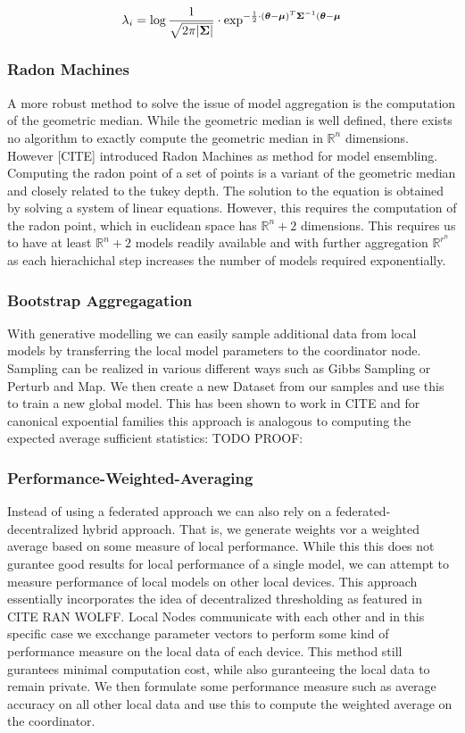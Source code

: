 \begin{equation}
    \lambda_i = \log \frac{1}{\sqrt{2\pi\lvert \boldsymbol{\Sigma} \rvert}} \cdot \exp^{-\frac{1}{2} \cdot (\boldsymbol{\theta} - \boldsymbol{\mu})^T\boldsymbol{\Sigma}^{-1}(\boldsymbol{\theta} - \boldsymbol{\mu}}
\end{equation}
\subsubsection{Radon Machines}
A more robust method to solve the issue of model aggregation is the computation of the geometric median.
While the geometric median is well defined, there exists no algorithm to exactly compute the geometric median in $\mathbb{R}^n$ dimensions.
However [CITE] introduced Radon Machines as method for model ensembling.
Computing the radon point of a set of points is a variant of the geometric median and closely related to the tukey depth. 
The solution to the equation is obtained by solving a system of linear equations.
However, this requires the computation of the radon point, which in euclidean space has $\mathbb{R}^n + 2$ dimensions.
This requires us to have at least $\mathbb{R}^n + 2$ models readily available and with further aggregation $\mathbb{R}^{r^n}$ as each hierachichal step increases the number of models required exponentially.

\subsubsection{Bootstrap Aggregagation}
With generative modelling we can easily sample additional data from local models by transferring the local model parameters to the coordinator node.
Sampling can be realized in various different ways such as Gibbs Sampling or Perturb and Map.
We then create a new Dataset from our samples and use this to train a new global model. 
This has been shown to work in CITE and for canonical expoential families this approach is analogous to computing the expected average sufficient statistics:
TODO PROOF:


\subsubsection{Performance-Weighted-Averaging}
Instead of using a federated approach we can also rely on a federated-decentralized hybrid approach. 
That is, we generate weights vor a weighted average based on some measure of local performance.
While this this does not gurantee good results for local performance of a single model, we can attempt to measure performance of local models on other local devices.
This approach essentially incorporates the idea of decentralized thresholding as featured in CITE RAN WOLFF.
Local Nodes communicate with each other and in this specific case we excchange parameter vectors to perform some kind of performance measure on the local data of each device.
This method still gurantees minimal computation cost, while also guranteeing the local data to remain private.
We then formulate some performance measure such as average accuracy on all other local data and use this to compute the weighted average on the coordinator.

